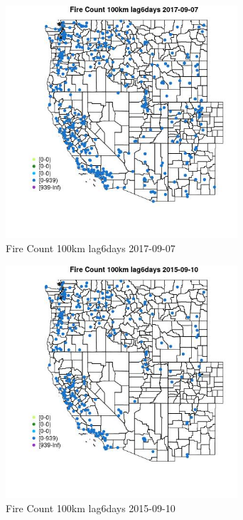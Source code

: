 \begin{figure} 
\centering  
\includegraphics[width=0.77\textwidth]{Code_Outputs/Report_ML_input_PM25_Step4_part_e_de_duplicated_aves_compiled_2019-05-21wNAs_MapObsFire_Count_100km_lag6days2017-09-07.jpg} 
\caption{\label{fig:Report_ML_input_PM25_Step4_part_e_de_duplicated_aves_compiled_2019-05-21wNAsMapObsFire_Count_100km_lag6days2017-09-07}Fire Count 100km lag6days 2017-09-07} 
\end{figure} 
 

\begin{figure} 
\centering  
\includegraphics[width=0.77\textwidth]{Code_Outputs/Report_ML_input_PM25_Step4_part_e_de_duplicated_aves_compiled_2019-05-21wNAs_MapObsFire_Count_100km_lag6days2015-09-10.jpg} 
\caption{\label{fig:Report_ML_input_PM25_Step4_part_e_de_duplicated_aves_compiled_2019-05-21wNAsMapObsFire_Count_100km_lag6days2015-09-10}Fire Count 100km lag6days 2015-09-10} 
\end{figure} 
 

